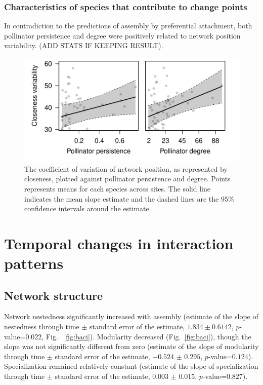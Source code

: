 \documentclass[12pt]{article}
\begin{document}
\subsubsection*{Characteristics of species that contribute to change
  points}

In contradiction to the predictions of assembly by preferential
attachment, both pollinator persistence and degree were positively
related to network position variability. (ADD STATS IF KEEPING
RESULT).

\begin{figure}
  \centering
  \includegraphics[width=.8\textwidth]{../analysis/variability/figures/cv/occ_degree.pdf}
  \caption{The coefficient of variation of network position, as
    represented by closeness, plotted against pollinator persistence
    and degree. Points represents means for each species across sites.
    The solid line indicates the mean slope estimate and the dashed
    lines are the $95\%$ confidence intervals around the estimate. }
  \label{fig:cv}
\end{figure}
\clearpage

\section*{Temporal changes in interaction patterns}
\subsection*{Network structure}
Network nestedness significantly increased with assembly (estimate of
the slope of nestedness through time $\pm$ standard error of the
estimate, $1.834 \pm 0.6142$, $p$-value=$0.022$, Fig.~
\ref{fig:baci}).  Modularity decreased (Fig.~\ref{fig:baci}), though
the slope was not significantly different from zero (estimate of the
slope of modularity through time $\pm$ standard error of the estimate,
$-0.524$ $\pm$ $0.295$, $p$-value=$0.124$). Specialization remained
relatively constant (estimate of the slope of specialization through time
$\pm$ standard error of the estimate, $0.003$ $\pm$ $0.015$,
$p$-value=$0.827$).
\end{document}
